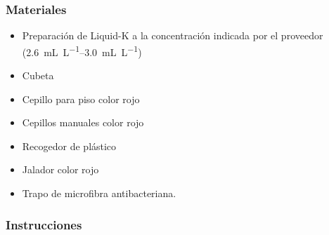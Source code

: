 \subsubsection{Materiales}
\begin{itemize}
	\item Preparación de Liquid-K a la concentración indicada por el proveedor (\qtyrange{2.6}{3.0}{\milli\liter\per\liter})
	\item Cubeta
	\item Cepillo para piso color rojo
	\item Cepillos manuales color rojo
	\item Recogedor de plástico
	\item Jalador color rojo
	\item Trapo de microfibra antibacteriana.
\end{itemize}

\subsubsection{Instrucciones}
